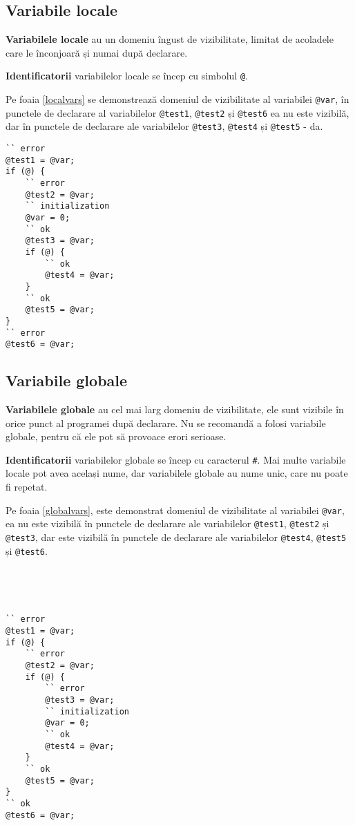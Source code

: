 \subsection{Variabile locale}

\textbf{Variabilele locale} au un domeniu îngust de vizibilitate, limitat de acoladele care le înconjoară și numai după declarare.

{\bf Identificatorii} variabilelor locale se încep cu simbolul \lstinline|@|.

Pe foaia \ref{localvars} se demonstrează domeniul de vizibilitate al variabilei \lstinline|@var|, în punctele de declarare al variabilelor \lstinline|@test1|, \lstinline|@test2| și \lstinline|@test6| ea nu este vizibilă, dar în punctele de declarare ale variabilelor \lstinline|@test3|, \lstinline|@test4| și \lstinline|@test5| - da.
\begin{lstlisting}[caption=Domeniul de vizibilitate al variabilei locale, label=localvars]
`` error
@test1 = @var;
if (@) {
	`` error
	@test2 = @var;
	`` initialization
	@var = 0;
	`` ok
	@test3 = @var;
	if (@) {
		`` ok
		@test4 = @var;
	}
	`` ok
	@test5 = @var;
}
`` error
@test6 = @var;
\end{lstlisting}

\subsection{Variabile globale}

\textbf{Variabilele globale} au cel mai larg domeniu de vizibilitate, ele sunt vizibile în orice punct al programei după declarare. Nu se recomandă a folosi variabile globale, pentru că ele pot să provoace erori serioase.

{\bf Identificatorii} variabilelor globale se încep cu caracterul {\color{blue2}\lstinline|#|}. Mai multe variabile locale pot avea același nume, dar variabilele globale au nume unic, care nu poate fi repetat.

Pe foaia \ref{globalvars}, este demonstrat domeniul de vizibilitate al variabilei \lstinline|@var|, ea nu este vizibilă în punctele de declarare ale variabilelor \lstinline|@test1|, \lstinline|@test2| și \lstinline|@test3|, dar este vizibilă în punctele de declarare ale variabilelor \lstinline|@test4|, \lstinline|@test5| și \lstinline|@test6|.

\

\

\begin{lstlisting}[caption=Domeniu de vizibilitate al variabilei globale, label=globalvars]
`` error
@test1 = @var;
if (@) {
	`` error
	@test2 = @var;
	if (@) {
		`` error
		@test3 = @var;
		`` initialization
		@var = 0;
		`` ok
		@test4 = @var;
	}
	`` ok
	@test5 = @var;
}
`` ok
@test6 = @var;
\end{lstlisting}

